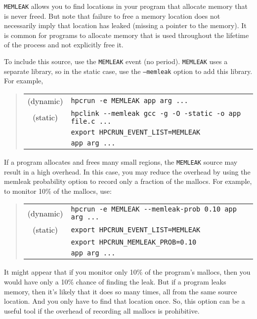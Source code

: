 {\tt MEMLEAK} allows you to find locations in your program that
allocate memory that is never freed.  But note that failure to free a
memory location does not necessarily imply that location has leaked
(missing a pointer to the memory).  It is common for programs to
allocate memory that is used throughout the lifetime of the process
and not explicitly free it.

To include this source, use the {\tt MEMLEAK} event (no period).
{\tt MEMLEAK} uses a separate library, so in the static case, use the
{\tt --memleak} option to add this library.  For example,

\begin{quote}
\begin{tabular}{@{}cl}
(dynamic) & \verb|hpcrun -e MEMLEAK app arg ...| \\
(static)  & \verb|hpclink --memleak gcc -g -O -static -o app file.c ...| \\
& \verb|export HPCRUN_EVENT_LIST=MEMLEAK| \\
& \verb|app arg ...|
\end{tabular}
\end{quote}

If a program allocates and frees many small regions, the {\tt MEMLEAK}
source may result in a high overhead.  In this case, you may reduce
the overhead by using the memleak probability option to record only a
fraction of the mallocs.  For example, to monitor 10\% of the mallocs,
use:

\begin{quote}
\begin{tabular}{@{}cl}
(dynamic) & \verb|hpcrun -e MEMLEAK --memleak-prob 0.10 app arg ...| \\
(static)  & \verb|export HPCRUN_EVENT_LIST=MEMLEAK| \\
& \verb|export HPCRUN_MEMLEAK_PROB=0.10| \\
& \verb|app arg ...|
\end{tabular}
\end{quote}

It might appear that if you monitor only 10\% of the program's
mallocs, then you would have only a 10\% chance of finding the leak.
But if a program leaks memory, then it's likely that it does so many
times, all from the same source location.  And you only have to find
that location once.  So, this option can be a useful tool if the
overhead of recording all mallocs is prohibitive.


